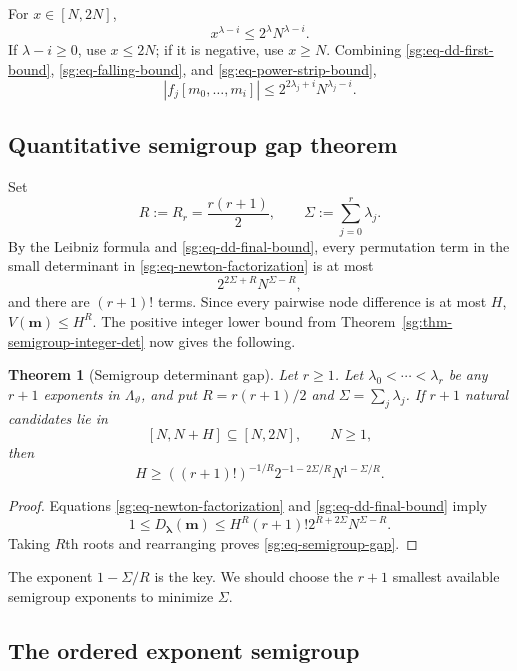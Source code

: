 \documentclass[11pt,oneside]{article}
\newtheorem{theorem}{Theorem}[section]
\theoremstyle{definition}
\theoremstyle{remark}
\newcommand{\thetaq}{\vartheta}
\newcommand{\LambdaTheta}{\Lambda_{\thetaq}}
\begin{document}
For $x\in[N,2N]$,
\begin{equation}
 x^{\lambda-i}\le2^\lambda N^{\lambda-i}.
 \label{sg:eq-power-strip-bound}
\end{equation}
If $\lambda-i\ge0$, use $x\le2N$; if it is negative, use $x\ge N$.
Combining \eqref{sg:eq-dd-first-bound}, \eqref{sg:eq-falling-bound}, and
\eqref{sg:eq-power-strip-bound},
\begin{equation}
 |f_j[m_0,\ldots,m_i]|
 \le2^{2\lambda_j+i}N^{\lambda_j-i}.
 \label{sg:eq-dd-final-bound}
\end{equation}

\subsection{Quantitative semigroup gap theorem}

Set
\[
 R:=R_r=\frac{r(r+1)}2,
 \qquad
 \Sigma:=\sum_{j=0}^{r}\lambda_j.
\]
By the Leibniz formula and \eqref{sg:eq-dd-final-bound}, every permutation term in the small
determinant in \eqref{sg:eq-newton-factorization} is at most
\[
 2^{2\Sigma+R}N^{\Sigma-R},
\]
and there are $(r+1)!$ terms.  Since every pairwise node difference is at most $H$,
$V(\boldsymbol m)\le H^R$.  The positive integer lower bound from
Theorem~\ref{sg:thm-semigroup-integer-det} now gives the following.

\begin{theorem}[Semigroup determinant gap]
\label{sg:thm-semigroup-gap}
Let $r\ge1$.  Let $\lambda_0<\cdots<\lambda_r$ be any $r+1$ exponents in
$\LambdaTheta$, and put $R=r(r+1)/2$ and $\Sigma=\sum_j\lambda_j$.  If $r+1$ natural
candidates lie in
\[
 [N,N+H]\subseteq[N,2N],
 \qquad N\ge1,
\]
then
\begin{equation}
 H\ge
 ((r+1)!)^{-1/R}
 2^{-1-2\Sigma/R}
 N^{1-\Sigma/R}.
 \label{sg:eq-semigroup-gap}
\end{equation}
\end{theorem}

\begin{proof}
Equations \eqref{sg:eq-newton-factorization} and \eqref{sg:eq-dd-final-bound} imply
\[
 1\le D_{\boldsymbol\lambda}(\boldsymbol m)
 \le
 H^R(r+1)!2^{R+2\Sigma}N^{\Sigma-R}.
\]
Taking $R$th roots and rearranging proves \eqref{sg:eq-semigroup-gap}.
\end{proof}

The exponent $1-\Sigma/R$ is the key.  We should choose the $r+1$ smallest available
semigroup exponents to minimize $\Sigma$.

\subsection{The ordered exponent semigroup}
\end{document}
